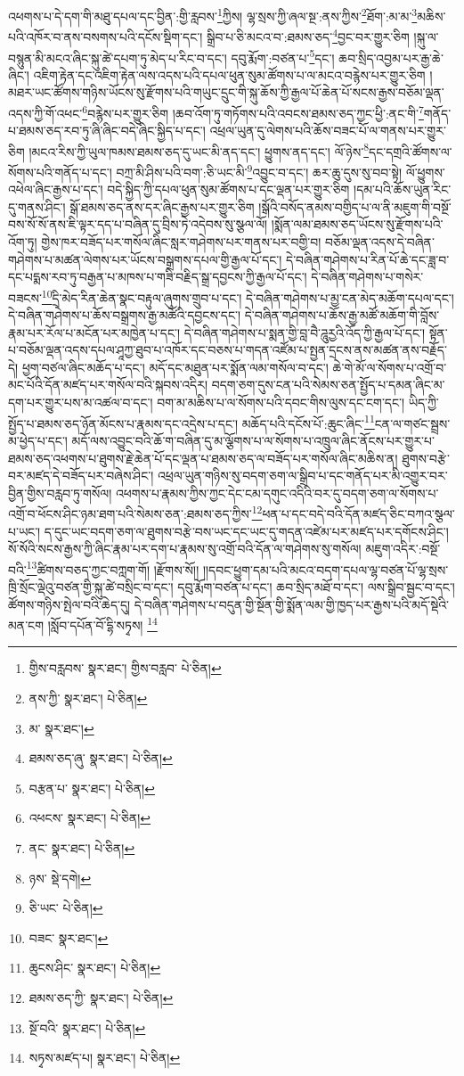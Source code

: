 འཕགས་པ་དེ་དག་གི་མཐུ་དཔལ་དང་བྱིན་:གྱི་རླབས་\footnote{གྱིས་བརླབས་  སྣར་ཐང་། གྱིས་བརླབ་  པེ་ཅིན། }ཀྱིས། ལྷ་སྲས་ཀྱི་ཞལ་སྔ་:ནས་ཀྱིས་\footnote{ནས་ཀྱི་  སྣར་ཐང་།  པེ་ཅིན། }ཐོག་:མ་མ་\footnote{མ་  སྣར་ཐང་། }མཆིས་པའི་འཁོར་བ་ནས་བསགས་པའི་དངོས་སྡིག་དང་། སྒྲིབ་པ་ཅི་མངའ་བ་:ཐམས་ཅད་\footnote{ཐམས་ཅད་ཞུ་  སྣར་ཐང་།  པེ་ཅིན། }བྱང་བར་གྱུར་ཅིག །སྐུ་ལ་བསྙུན་མི་མངའ་ཞིང་སྐུ་ཚེ་དཔག་ཏུ་མེད་པ་རིང་བ་དང་། དབུ་རྨོག་:བཙན་པ་\footnote{བརྩན་པ་  སྣར་ཐང་།  པེ་ཅིན། }དང་། ཆབ་སྲིད་འབྱམ་པར་རྒྱ་ཆེ་ཞིང་། འཇིག་རྟེན་དང་འཇིག་རྟེན་ལས་འདས་པའི་དཔལ་ཕུན་སུམ་ཚོགས་པ་ལ་མངའ་བརྙེས་པར་གྱུར་ཅིག །མཐར་ཡང་ཚོགས་གཉིས་ཡོངས་སུ་རྫོགས་པའི་གཡུང་དྲུང་གི་སྐུ་ཆོས་ཀྱི་རྒྱལ་པོ་ཆེན་པོ་སངས་རྒྱས་བཅོམ་ལྡན་འདས་ཀྱི་གོ་འཕང་\footnote{འཕངས་  སྣར་ཐང་།  པེ་ཅིན། }བརྙེས་པར་གྱུར་ཅིག །ཆབ་འོག་ཏུ་གཏོགས་པའི་འབངས་ཐམས་ཅད་ཀྱང་ཕྱི་:ནང་གི་\footnote{ནང་  སྣར་ཐང་།  པེ་ཅིན། }གནོད་པ་ཐམས་ཅད་རབ་ཏུ་ཞི་ཞིང་བདེ་ཞིང་སྐྱིད་པ་དང་། འཕྲལ་ཡུན་དུ་ལེགས་པའི་ཆོས་བཟང་པོ་ལ་གནས་པར་གྱུར་ཅིག །མངའ་རིས་ཀྱི་ཡུལ་ཁམས་ཐམས་ཅད་དུ་ཡང་མི་ནད་དང་། ཕྱུགས་ནད་དང་། ལོ་ཉེས་\footnote{ཉས་  སྡེ་དགེ། }དང་དགྲའི་ཚོགས་ལ་སོགས་པའི་གནོད་པ་དང་། བཀྲ་མི་ཤིས་པའི་བག་:ཅི་ཡང་མི་\footnote{ཅི་ཡང་  པེ་ཅིན། }འབྱུང་བ་དང་། ཆར་ཆུ་དུས་སུ་བབ་སྟེ། ལོ་ཕྱུགས་འཕེལ་ཞིང་རྒྱས་པ་དང་། བདེ་སྐྱིད་ཀྱི་དཔལ་ཕུན་སུམ་ཚོགས་པ་དང་ལྡན་པར་གྱུར་ཅིག །དམ་པའི་ཆོས་ཡུན་རིང་དུ་གནས་ཤིང་། སྒོ་ཐམས་ཅད་ནས་དར་ཞིང་རྒྱས་པར་གྱུར་ཅིག །སྒོའི་བསོད་ནམས་བགྱིད་པ་ལ་ནི་མཇུག་གི་བསྔོ་བས་སོ་སོ་ནས་ཇི་ལྟར་དད་པ་བཞིན་དུ་བྲིས་ཏེ་འདེབས་སུ་སྩལ་ལོ། །སྨོན་ལམ་ཐམས་ཅད་ཡོངས་སུ་རྫོགས་པའི་འོག་ཏུ། གྱེས་ཁར་བཟོད་པར་གསོལ་ཞིང་སླར་གཤེགས་པར་གནས་པར་བགྱི་བ། བཅོམ་ལྡན་འདས་དེ་བཞིན་གཤེགས་པ་མཚན་ལེགས་པར་ཡོངས་བསྒྲགས་དཔལ་གྱི་རྒྱལ་པོ་དང་། དེ་བཞིན་གཤེགས་པ་རིན་པོ་ཆེ་དང་ཟླ་བ་དང་པདྨས་རབ་ཏུ་བརྒྱན་པ་མཁས་པ་གཟི་བརྗིད་སྒྲ་དབྱངས་ཀྱི་རྒྱལ་པོ་དང་། དེ་བཞིན་གཤེགས་པ་གསེར་བཟངས་\footnote{བཟང་  སྣར་ཐང་། }དྲི་མེད་རིན་ཆེན་སྣང་བརྟུལ་ཞུགས་གྲུབ་པ་དང་། དེ་བཞིན་གཤེགས་པ་མྱ་ངན་མེད་མཆོག་དཔལ་དང་། དེ་བཞིན་གཤེགས་པ་ཆོས་བསྒྲགས་རྒྱ་མཚོའི་དབྱངས་དང་། དེ་བཞིན་གཤེགས་པ་ཆོས་རྒྱ་མཚོ་མཆོག་གི་བློས་རྣམ་པར་རོལ་པ་མངོན་པར་མཁྱེན་པ་དང་། དེ་བཞིན་གཤེགས་པ་སྨན་གྱི་བླ་བཻ་ཌཱུརྱའི་འོད་ཀྱི་རྒྱལ་པོ་དང་། སྟོན་པ་བཅོམ་ལྡན་འདས་དཔལ་ཤཱཀྱ་ཐུབ་པ་འཁོར་དང་བཅས་པ་གདན་འཛོམ་པ་སྤྱན་དྲངས་ནས་མཚན་ནས་བརྗོད་དེ། ཕྱག་བཙལ་ཞིང་མཆོད་པ་དང་། མདོ་དང་མཐུན་པར་སྨོན་ལམ་གསོལ་བ་དང་། ཆེ་གེ་མོ་ལ་སོགས་པ་འགྲོ་བ་མང་པོའི་དོན་མཛད་པར་གསོལ་བའི་སྐབས་འདིར། བདག་ཅག་དུས་ངན་པའི་སེམས་ཅན་སྤྱོད་པ་དམན་ཞིང་མ་དག་པར་གྱུར་པས་མ་འཚལ་བ་དང་། བག་མ་མཆིས་པ་ལ་སོགས་པའི་དབང་གིས་ལུས་དང་ངག་དང་། ཡིད་ཀྱི་སྤྱོད་པ་ཐམས་ཅད་ཉོན་མོངས་པ་རྣམས་དང་འདྲེས་པ་དང་། མཆོད་པའི་དངོས་པོ་:ཆུང་ཞིང་\footnote{ཆུངས་ཤིང་  སྣར་ཐང་།  པེ་ཅིན། }ངན་ལ་གཙང་སྦྲས་མ་ཕྱེད་པ་དང་། མདོ་ལས་འབྱུང་བའི་ཆོ་ག་བཞིན་དུ་མ་ལྕོགས་པ་ལ་སོགས་པ་འཁྲུལ་ཞིང་ནོངས་པར་གྱུར་པ་ཐམས་ཅད་འཕགས་པ་ཐུགས་རྗེ་ཆེན་པོ་དང་ལྡན་པ་ཐམས་ཅད་ལ་བཟོད་པར་གསོལ་ཞིང་མཆིས་ན། ཐུགས་བརྩེ་བར་མཛད་དེ་བཟོད་པར་བཞེས་ཤིང་། འཕྲལ་ཡུན་གཉིས་སུ་བདག་ཅག་ལ་སྒྲིབ་པ་དང་གནོད་པར་མི་འགྱུར་བར་བྱིན་གྱིས་བརླབ་ཏུ་གསོལ། འཕགས་པ་རྣམས་ཀྱིས་ཀྱང་དེང་ངམ་དགུང་འདིའི་བར་དུ་བདག་ཅག་ལ་སོགས་པ་འགྲོ་བ་ཕོངས་ཤིང་ཉམ་ཐག་པའི་སེམས་ཅན་:ཐམས་ཅད་ཀྱིས་\footnote{ཐམས་ཅད་ཀྱི་  སྣར་ཐང་།  པེ་ཅིན། }ཕན་པ་དང་བདེ་བའི་དོན་མཛད་ཅིང་བཀའ་སྩལ་པ་ཡང་། ད་དུང་ཡང་བདག་ཅག་ལ་ཐུགས་བརྩེ་བས་ཡང་དང་ཡང་དུ་གདན་འཛེམ་པར་མཛད་པར་དགོངས་ཤིང་། སོ་སོའི་སངས་རྒྱས་ཀྱི་ཞིང་རྣམ་པར་དག་པ་རྣམས་སུ་འགྲོ་བའི་དོན་ལ་གཤེགས་སུ་གསོལ། མཇུག་འདིར་:བསྔོ་བའི་\footnote{སྔོ་བའི་  སྣར་ཐང་།  པེ་ཅིན། }ཚིགས་བཅད་ཀྱང་བཀླག་གོ། །རྫོགས་སོ།། །།དབང་ཕྱུག་དམ་པའི་མངའ་བདག་དཔལ་ལྷ་བཙན་པོ་ལྷ་སྲས་ཁྲི་སྲོང་ལྡེའུ་བཙན་གྱི་སྐུ་ཚེ་བསྲིང་བ་དང་། དབུ་རྨོག་བཙན་པ་དང་། ཆབ་སྲིད་མཐོ་བ་དང་། ལས་སྒྲིབ་སྦྱང་བ་དང་། ཚོགས་གཉིས་སྤེལ་བའི་ཆེད་དུ། དེ་བཞིན་གཤེགས་པ་བདུན་གྱི་སྔོན་གྱི་སྨོན་ལམ་གྱི་ཁྱད་པར་རྒྱས་པའི་མདོ་སྡེའི་མན་ངག །སློབ་དཔོན་བོ་དྷི་སཏྭས། \footnote{སཏྭས་མཛད་པ།   སྣར་ཐང་།  པེ་ཅིན། }